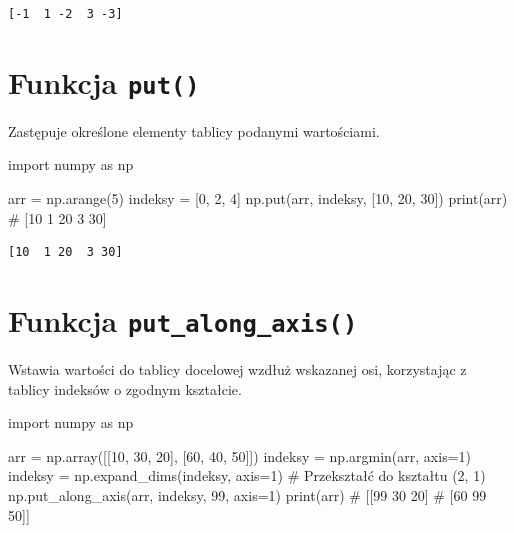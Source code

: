 \documentclass[
  polish,
  letterpaper,
  DIV=11,
  numbers=noendperiod]{scrreprt}
\newenvironment{Shaded}{\begin{snugshade}}{\end{snugshade}}
\newcommand{\BuiltInTok}[1]{\textcolor[rgb]{0.00,0.23,0.31}{#1}}
\newcommand{\CommentTok}[1]{\textcolor[rgb]{0.37,0.37,0.37}{#1}}
\newcommand{\DecValTok}[1]{\textcolor[rgb]{0.68,0.00,0.00}{#1}}
\newcommand{\ImportTok}[1]{\textcolor[rgb]{0.00,0.46,0.62}{#1}}
\newcommand{\NormalTok}[1]{\textcolor[rgb]{0.00,0.23,0.31}{#1}}
\newcommand{\OperatorTok}[1]{\textcolor[rgb]{0.37,0.37,0.37}{#1}}
\begin{document}
\begin{verbatim}
[-1  1 -2  3 -3]
\end{verbatim}

\section{\texorpdfstring{Funkcja
\texttt{put()}}{Funkcja put()}}\label{funkcja-put}

Zastępuje określone elementy tablicy podanymi wartościami.

\begin{Shaded}
\begin{Highlighting}[]
\ImportTok{import}\NormalTok{ numpy }\ImportTok{as}\NormalTok{ np}

\NormalTok{arr }\OperatorTok{=}\NormalTok{ np.arange(}\DecValTok{5}\NormalTok{)}
\NormalTok{indeksy }\OperatorTok{=}\NormalTok{ [}\DecValTok{0}\NormalTok{, }\DecValTok{2}\NormalTok{, }\DecValTok{4}\NormalTok{]}
\NormalTok{np.put(arr, indeksy, [}\DecValTok{10}\NormalTok{, }\DecValTok{20}\NormalTok{, }\DecValTok{30}\NormalTok{])}
\BuiltInTok{print}\NormalTok{(arr)  }\CommentTok{\# [10  1 20  3 30]}
\end{Highlighting}
\end{Shaded}

\begin{verbatim}
[10  1 20  3 30]
\end{verbatim}

\section{\texorpdfstring{Funkcja
\texttt{put\_along\_axis()}}{Funkcja put\_along\_axis()}}\label{funkcja-put_along_axis}

Wstawia wartości do tablicy docelowej wzdłuż wskazanej osi, korzystając
z tablicy indeksów o zgodnym kształcie.

\begin{Shaded}
\begin{Highlighting}[]
\ImportTok{import}\NormalTok{ numpy }\ImportTok{as}\NormalTok{ np}

\NormalTok{arr }\OperatorTok{=}\NormalTok{ np.array([[}\DecValTok{10}\NormalTok{, }\DecValTok{30}\NormalTok{, }\DecValTok{20}\NormalTok{], [}\DecValTok{60}\NormalTok{, }\DecValTok{40}\NormalTok{, }\DecValTok{50}\NormalTok{]])}
\NormalTok{indeksy }\OperatorTok{=}\NormalTok{ np.argmin(arr, axis}\OperatorTok{=}\DecValTok{1}\NormalTok{)}
\NormalTok{indeksy }\OperatorTok{=}\NormalTok{ np.expand\_dims(indeksy, axis}\OperatorTok{=}\DecValTok{1}\NormalTok{)  }\CommentTok{\# Przekształć do kształtu (2, 1)}
\NormalTok{np.put\_along\_axis(arr, indeksy, }\DecValTok{99}\NormalTok{, axis}\OperatorTok{=}\DecValTok{1}\NormalTok{)}
\BuiltInTok{print}\NormalTok{(arr)}
\CommentTok{\# [[99 30 20]}
\CommentTok{\#  [60 99 50]]}
\end{Highlighting}
\end{Shaded}
\end{document}
